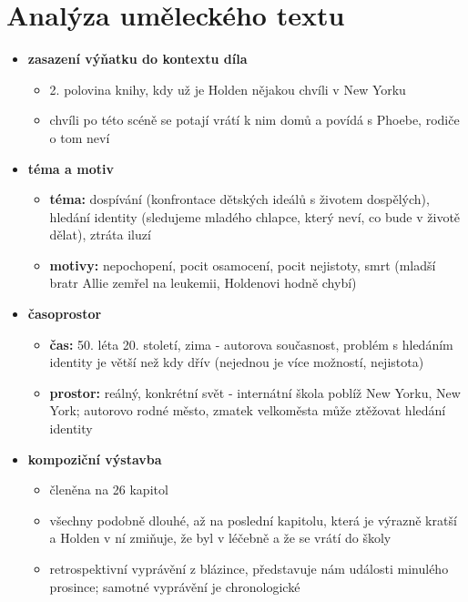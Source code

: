 \documentclass[11pt]{article}
\begin{document}
    \section*{Analýza uměleckého textu}
    \begin{itemize}
        \item\textbf{zasazení výňatku do kontextu díla}
        \begin{itemize}
            \item 2. polovina knihy, kdy už je Holden nějakou chvíli v New Yorku
            \item chvíli po této scéně se potají vrátí k nim domů a povídá s Phoebe, rodiče o tom neví
        \end{itemize}
        \item\textbf{téma a motiv}
        \begin{itemize}
            \item\textbf{téma: }dospívání (konfrontace dětských ideálů s životem dospělých), hledání identity (sledujeme mladého chlapce, který neví, co bude v životě dělat), ztráta iluzí
            \item\textbf{motivy: }nepochopení, pocit osamocení, pocit nejistoty, smrt (mladší bratr Allie zemřel na leukemii, Holdenovi hodně chybí)
        \end{itemize}
        \item\textbf{časoprostor}
        \begin{itemize}
            \item\textbf{čas: }50. léta 20. století, zima - autorova současnost, problém s hledáním identity je větší než kdy dřív (nejednou je více možností, nejistota)
            \item\textbf{prostor: }reálný, konkrétní svět - internátní škola poblíž New Yorku, New York; autorovo rodné město, zmatek velkoměsta může ztěžovat hledání identity
        \end{itemize}
        \item\textbf{kompoziční výstavba}
        \begin{itemize}
            \item členěna na 26 kapitol
            \item všechny podobně dlouhé, až na poslední kapitolu, která je výrazně kratší a Holden v ní zmiňuje, že byl v léčebně a že se vrátí do školy
            \item retrospektivní vyprávění z blázince, představuje nám události minulého prosince; samotné vyprávění je chronologické
        \end{itemize}

\end{itemize}
\end{document}
